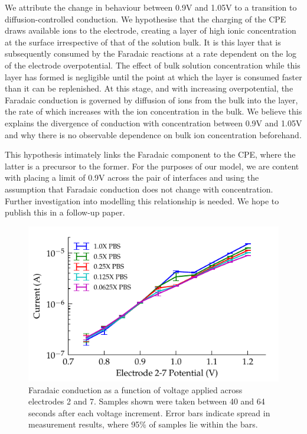 \documentclass[10pt,final,journal]{IEEEtran}
\begin{document}
We attribute the change in behaviour between 0.9\thinspace V and 1.05\thinspace V to a transition to diffusion-controlled conduction.
We hypothesise that the charging of the CPE draws available ions to the electrode, creating a layer of high ionic concentration at the surface irrespective of that of the solution bulk. It is this layer that is subsequently consumed by the Faradaic reactions at a rate dependent on the log of the electrode overpotential.  The effect of bulk solution concentration while this layer has formed is negligible until the point at which the layer is consumed faster than it can be replenished. At this stage, and with increasing overpotential, the Faradaic conduction is governed by diffusion of ions from the bulk into the layer, the rate of which increases with the ion concentration in the bulk. We believe this explains the divergence of conduction with concentration between 0.9\thinspace V and 1.05\thinspace V and why there is no observable dependence on bulk ion concentration beforehand. 

This hypothesis intimately links the Faradaic component to the CPE, where the latter is a precursor to the former. For the purposes of our model, we are content with placing a limit of 0.9\thinspace V across the pair of interfaces and using the assumption that Faradaic conduction does not change with concentration. Further investigation into modelling this relationship is needed. We hope to publish this in a follow-up paper. 

\begin{figure}
    \begin{center}
        \includegraphics{graphics/currentVoltage_logY_IEEE}
    \end{center}
    \caption{Faradaic conduction as a function of voltage applied across electrodes 2 and 7. Samples shown were taken between 40 and 64 seconds after each voltage increment. Error bars indicate spread in measurement results, where 95\% of samples lie within the bars.}
    \label{fig:faradaic_logCurrentVsVoltage}
\end{figure}
\end{document}

